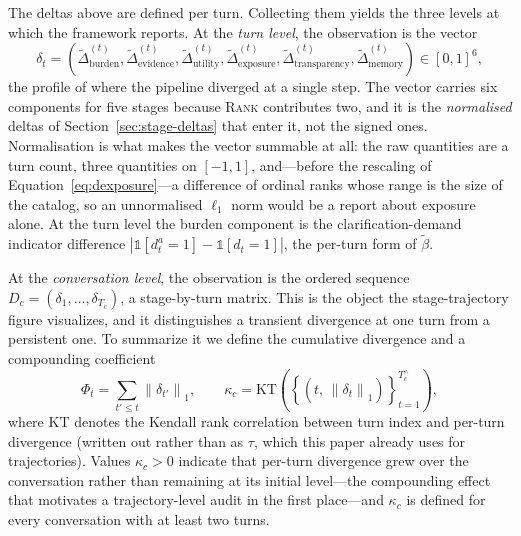 \documentclass[manuscript,screen,review]{acmart}
\newcommand{\Dnorm}{\widetilde{\Delta}}
\newcommand{\stage}[1]{\textsc{#1}}
\begin{document}
The deltas above are defined per turn. Collecting them yields the three levels at
which the framework reports. At the \emph{turn level}, the observation is the
vector
\begin{equation}
  \delta_t = \left(\Dnorm_{\mathrm{burden}}^{(t)},
    \Dnorm_{\mathrm{evidence}}^{(t)}, \Dnorm_{\mathrm{utility}}^{(t)},
    \Dnorm_{\mathrm{exposure}}^{(t)}, \Dnorm_{\mathrm{transparency}}^{(t)},
    \Dnorm_{\mathrm{memory}}^{(t)}\right) \in [0,1]^{6},
  \label{eq:deltavec}
\end{equation}
the profile of where the pipeline diverged at a single step. The vector carries six
components for five stages because \stage{Rank} contributes two, and it is the
\emph{normalised} deltas of Section~\ref{sec:stage-deltas} that enter it, not the
signed ones. Normalisation is what makes the vector summable at all: the raw
quantities are a turn count, three quantities on $[-1,1]$, and---before the
rescaling of Equation~\eqref{eq:dexposure}---a difference of ordinal ranks whose
range is the size of the catalog, so an unnormalised $\ell_1$ norm would be a
report about exposure alone. At the turn level the burden component is the
clarification-demand indicator difference $|\mathbb{1}[d^{a}_t = 1] -
\mathbb{1}[d_t = 1]|$, the per-turn form of $\tilde{\beta}$.

At the \emph{conversation level}, the observation is the ordered sequence $D_c =
(\delta_1,\dots,\delta_{T_c})$, a stage-by-turn matrix. This is the object the
stage-trajectory figure visualizes, and it distinguishes a transient divergence at
one turn from a persistent one. To summarize it we define the cumulative
divergence and a compounding coefficient
\begin{equation}
  \Phi_t = \sum_{t' \le t} \left\lVert \delta_{t'} \right\rVert_1,
  \qquad
  \kappa_c = \mathrm{KT}\!\left(\left\{\left(t,\,
    \left\lVert \delta_{t} \right\rVert_1\right)\right\}_{t=1}^{T^{\wedge}_c}\right),
  \label{eq:compounding}
\end{equation}
where $\mathrm{KT}$ denotes the Kendall rank correlation between turn index and
per-turn divergence (written out rather than as $\tau$, which this paper already
uses for trajectories). Values $\kappa_c > 0$ indicate that per-turn divergence grew over the
conversation rather than remaining at its initial level---the compounding effect
that motivates a trajectory-level audit in the first place---and $\kappa_c$ is
defined for every conversation with at least two turns.
\end{document}
